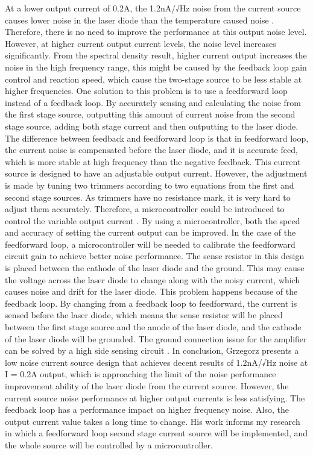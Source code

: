 At a lower output current of 0.2A, the 1.2nA/√Hz noise from the current source causes lower noise in the laser diode than the temperature caused noise \cite{LinewidthQuantumCascadeLaser}.  Therefore, there is no need to improve the performance at this output noise level.  However, at higher current output current levels, the noise level increases significantly.  From the spectral density result, higher current output increases the noise in the high frequency range, this might be caused by the feedback loop gain control and reaction speed, which cause the two-stage source to be less stable at higher frequencies.  One solution to this problem is to use a feedforward loop instead of a feedback loop.  By accurately sensing and calculating the noise from the first stage source, outputting this amount of current noise from the second stage source, adding both stage current and then outputting to the laser diode.  The difference between feedback and feedforward loop is that in feedforward loop, the current noise is compensated before the laser diode, and it is accurate feed, which is more stable at high frequency than the negative feedback.
This current source is designed to have an adjustable output current.  However, the adjustment is made by tuning two trimmers according to two equations from the first and second stage sources.  As trimmers have no resistance mark, it is very hard to adjust them accurately.  Therefore, a microcontroller could be introduced to control the variable output current \cite{Du_2018}.  By using a microcontroller, both the speed and accuracy of setting the current output can be improved.  In the case of the feedforward loop, a microcontroller will be needed to calibrate the feedforward circuit gain to achieve better noise performance.
The sense resistor in this design is placed between the cathode of the laser diode and the ground.  This may cause the voltage across the laser diode to change along with the noisy current, which causes noise and drift for the laser diode.  This problem happens because of the feedback loop.  By changing from a feedback loop to feedforward, the current is sensed before the laser diode, which means the sense resistor will be placed between the first stage source and the anode of the laser diode, and the cathode of the laser diode will be grounded.  The ground connection issue for the amplifier can be solved by a high side sensing circuit \cite{TI_2019}.
In conclusion, Grzegorz presents a low noise current source design that achieves decent results of 1.2nA/√Hz noise at I = 0.2A output, which is approaching the limit of the noise performance improvement ability of the laser diode from the current source.  However, the current source noise performance at higher output currents is less satisfying.  The feedback loop has a performance impact on higher frequency noise.  Also, the output current value takes a long time to change.  His work informs my research in which a feedforward loop second stage current source will be implemented, and the whole source will be controlled by a microcontroller.



